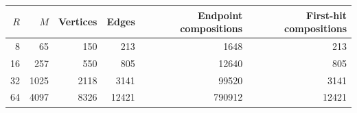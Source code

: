 \begin{center}\begin{tabular}{rrrrrr}\toprule
$R$ & $M$ & Vertices & Edges & Endpoint compositions & First-hit compositions\\\midrule
8 & 65 & 150 & 213 & 1648 & 213\\
16 & 257 & 550 & 805 & 12640 & 805\\
32 & 1025 & 2118 & 3141 & 99520 & 3141\\
64 & 4097 & 8326 & 12421 & 790912 & 12421\\
\bottomrule\end{tabular}\end{center}
